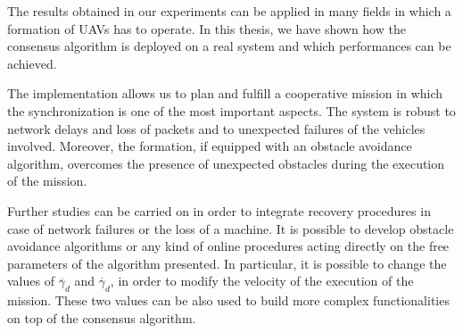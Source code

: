 
The results obtained in our experiments can be applied in many fields in which
a formation of UAVs has to operate.
In this thesis, we have shown how the consensus algorithm is deployed on a real
system and which performances can be achieved.

The implementation allows us to plan and fulfill a cooperative
mission in which the synchronization is one of the most important aspects.
The system is robust to network delays and loss of packets and to unexpected failures
of the vehicles involved.
Moreover, the formation, if equipped with an obstacle avoidance algorithm,
overcomes the presence of unexpected obstacles during the execution of the mission.

Further studies can be carried on in order to integrate recovery procedures in case
of network failures or the loss of a machine.
It is possible to develop obstacle avoidance algorithms or any kind of online procedures
acting directly on the free parameters of the algorithm presented.
In particular, it is possible to change the values of $\ddot{\gamma_d}$ and $\dot{\gamma_d}$,
in order to modify the velocity of the execution of the mission. These two values
can be also used to build more complex functionalities on top of the consensus algorithm.

